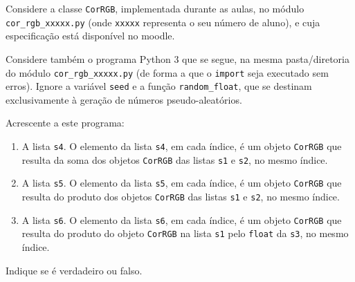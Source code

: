 \documentclass[12pt,varwidth=16cm,border=1pt]{standalone}
\begin{document}


Considere a classe \verb+CorRGB+, implementada durante as aulas, no módulo
\verb+cor_rgb_xxxxx.py+ (onde \verb+xxxxx+ representa o seu número de
aluno), e cuja especificação está disponível no moodle.

Considere também o programa Python 3 que se segue, na mesma
pasta/diretoria do módulo \verb+cor_rgb_xxxxx.py+ (de forma a que o
\verb+import+ seja executado sem erros). Ignore a variável \verb+seed+
e a função \verb+random_float+, que se destinam
exclusivamente à geração de números pseudo-aleatórios.



Acrescente a este programa:

\begin{enumerate}

\item A lista \verb+s4+. O elemento da lista \verb+s4+, em cada
  índice, é um objeto \verb+CorRGB+ que resulta da soma dos objetos
  \verb+CorRGB+ das listas \verb+s1+ e \verb+s2+, no mesmo
  índice.

\item A lista \verb+s5+. O elemento da lista \verb+s5+, em cada
  índice, é um objeto \verb+CorRGB+ que resulta do produto dos objetos
  \verb+CorRGB+ das listas \verb+s1+ e \verb+s2+, no mesmo
  índice.

\item A lista \verb+s6+. O elemento da lista \verb+s6+, em cada
  índice, é um objeto \verb+CorRGB+ que resulta do produto do objeto
  \verb+CorRGB+ na lista \verb+s1+ pelo \verb+float+ da
  \verb+s3+, no mesmo índice.

\end{enumerate}

Indique se é verdadeiro ou falso.
\end{document}
